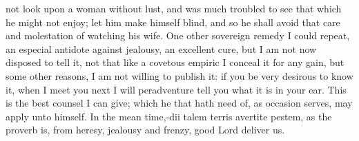 {not look upon a woman without lust, and was much troubled to see that
which he might not enjoy; let him make himself blind, and so he shall
avoid that care and molestation of watching his wife. One other
sovereign remedy I could repeat, an especial antidote against jealousy,
an excellent cure, but I am not now disposed to tell it, not that like
a covetous empiric I conceal it for any gain, but some other reasons, I
am not willing to publish it: if you be very desirous to know it, when
I meet you next I will peradventure tell you what it is in your ear.
This is the best counsel I can give; which he that hath need of, as
occasion serves, may apply unto himself. In the mean time,-dii talem
terris avertite pestem, as the proverb is, from heresy, jealousy
and frenzy, good Lord deliver us.
}
